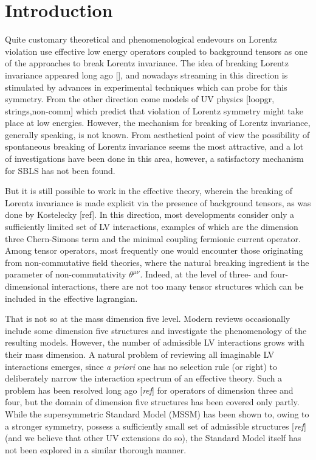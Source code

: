 \documentclass[12pt]{revtex4}
\begin{document}
\section{Introduction}

	
	Quite customary theoretical and phenomenological endevours on
	Lorentz violation use effective 
	low energy operators coupled to background tensors 
	as one of the approaches to break 
	Lorentz invariance.
	The idea of breaking Lorentz invariance appeared
	long ago [], and nowadays streaming in this direction is
	stimulated by advances in experimental techniques which can
	probe for this symmetry.
	From the other direction come models of 
	UV physics [loopgr,
	strings,non-comm] which predict that violation of 
	Lorentz symmetry might take place at low energies.
	However, the mechanism for breaking of Lorentz invariance, generally
	speaking, is not known.
	From aesthetical point of view the possibility of spontaneous
	breaking of Lorentz invariance seems the most attractive, 
	and a lot of investigations have been done in this
	area, however, a satisfactory mechanism for SBLS has not
	been found. 

	But it is still possible to work in the effective theory, wherein the
	breaking of Lorentz invariance is made explicit via the 
	presence of background tensors, as was done by Kostelecky [ref].
	In this direction, most developments consider only a sufficiently limited set
	of LV interactions, examples of which are the dimension three
	Chern-Simons term and the minimal coupling fermionic current operator. 
	Among tensor operators, most frequently one would encounter 
	those originating from non-commutative field theories, where the
	natural breaking ingredient is the parameter of non-commutativity
	$ \theta^{\mu\nu} $.
	Indeed, at the level of three- and four-dimensional interactions,
	there are not too many tensor structures which can be included
	in the effective lagrangian.	

	That is not so at the mass dimension five level.
	Modern reviews occasionally include some dimension five structures
	and investigate the phenomenology of the resulting models.
	However, the number of admissible LV interactions grows with their
	mass dimension.
	A natural problem of reviewing all imaginable LV interactions
	emerges, since {\it a priori} one has no selection rule (or right) to 
	deliberately narrow the interaction spectrum of an effective theory.
	Such a problem has been resolved long ago [{\it ref}] for operators of 
	dimension three and four, but the domain of dimension five structures has
	been covered only partly. 
	While the supersymmetric Standard Model (MSSM) has been shown to,
	owing to a stronger symmetry, possess a sufficiently small set of 
	admissible structures [{\it ref}] (and we believe that other
	UV extensions do so), the Standard Model itself has not 
	been explored in a similar thorough manner.
\end{document}
